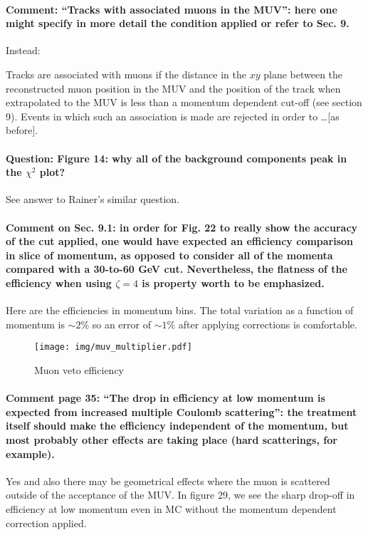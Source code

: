 \documentclass[12pt]{report}
\begin{document}
\paragraph{Comment: “Tracks with associated muons in the MUV”: here one might specify in more detail
the condition applied or refer to Sec. 9.\\}
Instead:

Tracks are associated with muons if the distance in the $xy$ plane between the reconstructed muon position in the MUV
and the position of the track when extrapolated to the MUV is less than a momentum dependent cut-off (see section 9).
Events in which such an association is made are rejected in order to \dots [as before].


\paragraph{Question: Figure 14: why all of the background components peak in the $\chi^2$ plot?}
See answer to Rainer's similar question.

\paragraph{Comment on Sec. 9.1: in order for Fig. 22 to really show the accuracy of the cut applied, one
    would have expected an efficiency comparison in slice of momentum, as opposed to consider all of
    the momenta compared with a 30-to-60 GeV cut. Nevertheless, the flatness of the efficiency when
using  $\zeta = 4$ is property worth to be emphasized.}
Here are the efficiencies in momentum bins. The total variation as a function of momentum is $\sim 2\%$
so an error of $\sim 1\%$ after applying corrections is comfortable.
\begin{figure}[h!]
    \texttt{[image: img/muv\_multiplier.pdf]}
    \caption{Muon veto efficiency}
\end{figure}

\paragraph{Comment page 35: “The drop in efficiency at low momentum is expected from increased multiple Coulomb scattering”:
    the treatment itself should make the efficiency independent of the momentum, 
but most probably other effects are taking place (hard scatterings, for example).}
Yes and also there may be geometrical effects where the muon is scattered outside of the acceptance of the MUV.
In figure 29, we see the sharp drop-off in efficiency at low momentum even in MC without the momentum dependent correction applied.
\end{document}
